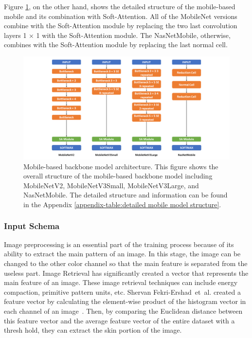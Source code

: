\documentclass[sensors,article,accept,pdftex,moreauthors]{Definitions/mdpi}
\begin{document}
	Figure \ref{fig:mobile-model-structure}, on the other hand, shows the detailed structure of the mobile-based mobile and its combination with Soft-Attention. All of the MobileNet versions combine with the Soft-Attention module by replacing the two last convolution layers 1 {$\times$} %
 1 with the Soft-Attention module. The NasNetMobile, otherwise, combines with the Soft-Attention module by replacing the last normal cell. 
	\begin{figure}[H]
		\includegraphics[width=0.9\linewidth]{Definitions/Mobile Model Structure.PNG}
		\caption{{Mobile-based} %
 backbone model architecture. This figure shows the overall structure of the mobile-based backbone model including MobileNetV2, MobileNetV3Small, MobileNetV3Large, and NasNetMobile. The detailed structure and information can be found in the Appendix \ref{appendix-table:detailed mobile model structure}.}
		\label{fig:mobile-model-structure}
	\end{figure}
	
	\subsubsection{Input Schema}
	{Image preprocessing is an essential part of the training process because of its ability to extract the main pattern of an image. In this stage, the image can be changed to the other color channel so that the main feature is separated from the useless part. Image Retrieval  has significantly created a vector that represents the main feature of an image. These image retrieval techniques can include energy compaction, primitive pattern units, etc. Shervan Fekri-Ershad~et~al. created a feature vector by calculating the element-wise product of the histogram vector in each channel of an image~\mbox{\cite{2012.4305}}}. Then, by comparing the Euclidean distance between this feature vector and the average feature vector of the entire dataset with a thresh hold, they can extract the skin portion of the image.
	
\end{document}

